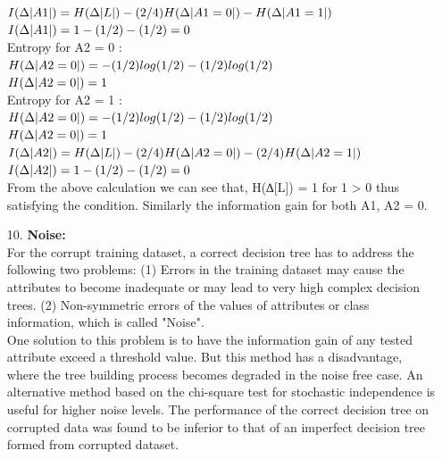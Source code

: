 \documentclass[12pt]{article}
\begin{document}
\begin{enumerate}
$I(\Delta \arrowvert A1 \arrowvert) = H(\Delta \arrowvert L \arrowvert)-(2/4)H(\Delta \arrowvert A1 = 0 \arrowvert)-H(\Delta \arrowvert A1 = 1 \arrowvert)$ \\
$I(\Delta \arrowvert A1 \arrowvert) = 1-(1/2)-(1/2) = 0$ \\

Entropy for A2 = 0 : \\
$H(\Delta \arrowvert A2 = 0 \arrowvert) = -(1/2)log(1/2)-(1/2)log(1/2)$ \\
$H(\Delta \arrowvert A2 = 0 \arrowvert) = 1$ \\

Entropy for A2 = 1 : \\
$H(\Delta \arrowvert A2 = 0 \arrowvert) = -(1/2)log(1/2)-(1/2)log(1/2)$ \\
$H(\Delta \arrowvert A2 = 0 \arrowvert) = 1$ \\

$I(\Delta \arrowvert A2 \arrowvert) = H(\Delta \arrowvert L \arrowvert)-(2/4)H(\Delta \arrowvert A2 = 0 \arrowvert)- (2/4)H(\Delta \arrowvert A2 = 1 \arrowvert)$ \\
$I(\Delta \arrowvert A2 \arrowvert) = 1-(1/2)-(1/2) = 0$ \\

From the above calculation we can see that, H(∆[L]) = 1 for 1 > 0 thus satisfying the condition. Similarly the information gain for both A1, A2 = 0. \\

\item[10.] \textbf{Noise:} \\

For the corrupt training dataset, a correct decision tree has to address the following two problems: (1) Errors in the training dataset may cause the attributes to become inadequate or may lead to very high complex decision trees. (2) Non-symmetric errors of the values of attributes or class information, which is called "Noise". \\

One solution to this problem is to have the information gain of any tested attribute exceed a threshold value. But this method has a disadvantage, where the tree building process becomes degraded in the noise free case. An alternative method based on the chi-square test for stochastic independence is useful for higher noise levels. The performance of the correct decision tree on corrupted data was found to be inferior to that of an imperfect decision tree formed from corrupted dataset.
\\



\end{enumerate}
\end{document}
